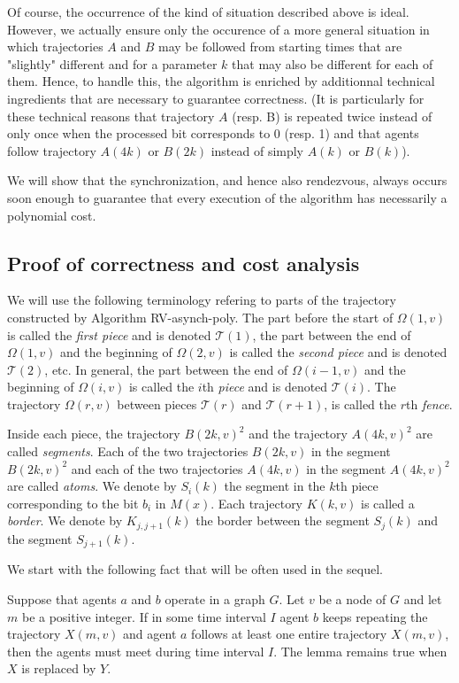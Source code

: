 \documentclass [11pt] {article}
\begin{document}
{Of course, the occurrence of the kind of situation described above is ideal. However, we actually ensure only the occurence of a more general situation in which trajectories $A$ and $B$ may be followed from starting times that are "slightly" different and for a parameter $k$ that may also be different for each of them. Hence, to handle this, the algorithm is enriched by additionnal technical ingredients that are necessary to guarantee correctness. (It is particularly for these technical reasons that trajectory $A$ (resp. B) is repeated twice instead of only once when the processed bit corresponds to $0$ (resp. 1) and that agents follow trajectory $A(4k)$ or $B(2k)$ instead of simply $A(k)$ or $B(k)$).}


{We will show that the synchronization, and hence also rendezvous, always occurs soon enough to guarantee that every execution of the algorithm has necessarily a polynomial cost.}


\subsection{Proof of correctness and cost analysis}

We will use the following terminology refering to parts of the trajectory constructed by Algorithm RV-asynch-poly. The part before the start of $\Omega(1,v)$ is called the {\em first piece}
and is denoted $\mathcal{T}(1)$,
the part between the end of $\Omega(1,v)$ and the beginning of $\Omega(2,v)$ is called the {\em second piece} and is denoted $\mathcal{T}(2)$, etc. In general, the part  
 between the end of $\Omega(i-1,v)$ and the beginning of $\Omega(i,v)$ is called the $i$th {\em  piece} and is denoted $\mathcal{T}(i)$.
 The trajectory $\Omega(r,v)$ between pieces $\mathcal{T}(r)$ and $\mathcal{T}(r+1)$, is called the $r$th {\em fence}.
 
 Inside each piece, the trajectory $B(2k,v)^2$ and the trajectory  $A(4k,v)^2$ are called {\em segments}. Each of the two trajectories $B(2k,v)$ in the segment $B(2k,v)^2$ and each of the two trajectories  $A(4k,v)$ in the segment  $A(4k,v)^2$ are called {\em atoms}. We denote by $S_i(k)$ the segment in the $k$th piece corresponding to the bit $b_i$ in $M(x)$.  Each trajectory
 $K(k,v)$ is called a {\em border}. We denote by $K_{j,j+1}(k)$ the border between the segment $S_j(k)$ and the segment $S_{j+1}(k)$.
 
 We start with the following fact that will be often used in the sequel.
 
 \begin{lemma}\label{tunel}
 Suppose that agents $a$ and $b$ operate in a graph $G$. Let $v$ be a node of $G$ and let $m$ be a positive integer. If in some time interval $I$ agent $b$ keeps repeating the trajectory $X(m,v)$ and agent $a$ follows at least one entire trajectory $X(m,v)$, then the agents must meet during time interval $I$.
 The lemma remains true when $X$ is replaced by $Y$.
 \end{lemma}
 
\end{document}
